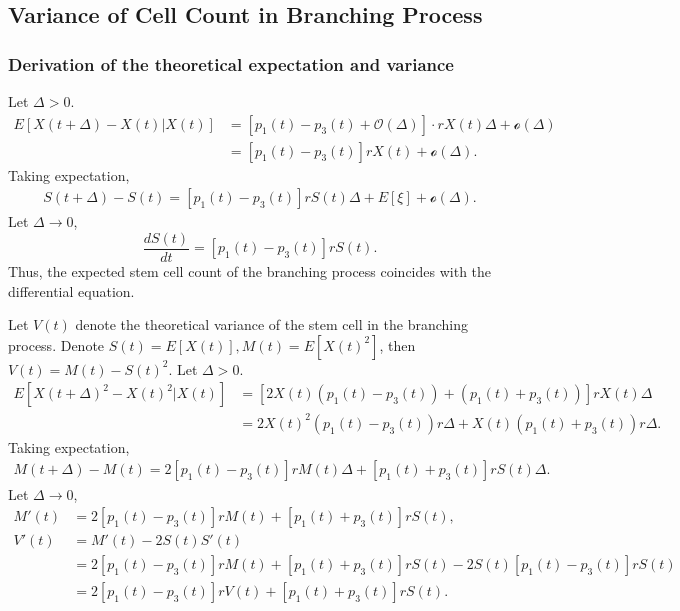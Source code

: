 \documentclass[11pt]{article}
\begin{document}
\subsection*{Variance of Cell Count in Branching Process}
\subsubsection*{Derivation of the theoretical expectation and variance}
Let $\Delta > 0$. 
\begin{equation}
    \begin{split}
        E[X(t + \Delta) - X(t) \vert X(t)] & = [p_1(t) - p_3(t) + \mathcal{O}(\Delta)] \cdot r X(t) \Delta + \mathcal{o}(\Delta) \\
        & = [p_1(t) - p_3(t)] rX(t) + \mathcal{o}(\Delta).
    \end{split}
\end{equation}
Taking expectation,
\begin{equation}
    \begin{split}
        S(t + \Delta) - S(t) = [p_1(t) - p_3(t)] r S(t) \Delta + E[\xi] + \mathcal{o}(\Delta).
    \end{split}
\end{equation}
Let $\Delta \rightarrow 0$,
\begin{equation}
    \frac{dS(t)}{dt} = [p_1(t) - p_3(t)]rS(t).
\end{equation}
Thus, the expected stem cell count of the branching process coincides with the differential equation.

Let $V(t)$ denote the theoretical variance of the stem cell in the branching process. Denote $S(t) = E[X(t)], M(t) = E[X(t)^2]$, then $V(t) = M(t) - S(t)^2$. Let $\Delta > 0$.
\begin{equation}
    \begin{split}
        E[X(t + \Delta)^2 - X(t)^2 \vert X(t)] & = [2 X(t) (p_1(t) - p_3(t)) + (p_1(t) + p_3(t))] rX(t) \Delta\\
        & = 2 X(t)^2(p_1(t)-p_3(t)) r \Delta + X(t) (p_1(t) + p_3(t) ) r\Delta.
    \end{split}
\end{equation}
Taking expectation,
\begin{equation}
    \begin{split}
        M(t + \Delta) - M(t) = 2[p_1(t) -p_3(t)] rM(t) \Delta + [p_1(t) + p_3(t)] rS(t) \Delta.
    \end{split}
\end{equation}
Let $\Delta \rightarrow0$,
\begin{equation}
\begin{split}
    M'(t) &= 2[p_1(t) -p_3(t)]rM(t) + [p_1(t) + p_3(t)]rS(t),\\
    V'(t) & = M'(t)  - 2S(t) S'(t) \\
    & = 2[p_1(t) - p_3(t)] rM(t) + [p_1(t) + p_3(t)]rS(t) - 2S(t)[p_1(t) - p_3(t)]rS(t) \\
    & = 2[p_1(t) -p_3(t)]rV(t) + [p_1(t) + p_3(t)]r S(t).
\end{split}
\end{equation}
\end{document}
